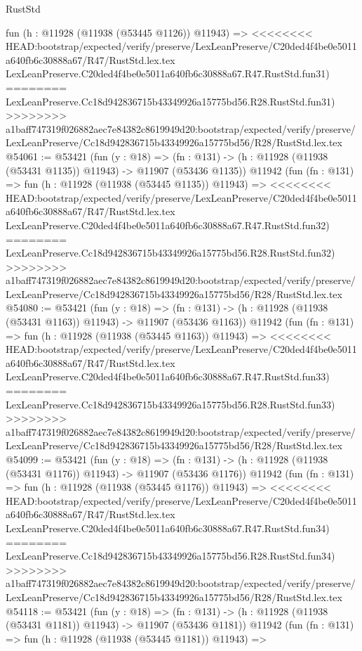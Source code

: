 \begin{lexlean}{RustStd}
\begin{coremodule}
{\begin{coremodule}
{{{{{{{{{{{{{{{{{{{{{{{{{{{{{{{{{{{{{{{{{{{{{{{{{{{{{{{{{{{{{{{{{{{{{{{{{{{{{{{{    fun (h : @11928 (@11938 (@53445 @1126)) @11943) =>
<<<<<<<< HEAD:bootstrap/expected/verify/preserve/LexLeanPreserve/C20ded4f4be0e5011a640fb6c30888a67/R47/RustStd.lex.tex
    LexLeanPreserve.C20ded4f4be0e5011a640fb6c30888a67.R47.RustStd.fun31)
========
    LexLeanPreserve.Cc18d942836715b43349926a15775bd56.R28.RustStd.fun31)
>>>>>>>> a1baff747319f026882aec7e84382c8619949d20:bootstrap/expected/verify/preserve/LexLeanPreserve/Cc18d942836715b43349926a15775bd56/R28/RustStd.lex.tex
@54061 := @53421
    (fun (y : @18) =>
    (fn : @131) -> (h : @11928 (@11938 (@53431 @1135)) @11943) -> @11907 (@53436 @1135))
    @11942
    (fun (fn : @131) =>
    fun (h : @11928 (@11938 (@53445 @1135)) @11943) =>
<<<<<<<< HEAD:bootstrap/expected/verify/preserve/LexLeanPreserve/C20ded4f4be0e5011a640fb6c30888a67/R47/RustStd.lex.tex
    LexLeanPreserve.C20ded4f4be0e5011a640fb6c30888a67.R47.RustStd.fun32)
========
    LexLeanPreserve.Cc18d942836715b43349926a15775bd56.R28.RustStd.fun32)
>>>>>>>> a1baff747319f026882aec7e84382c8619949d20:bootstrap/expected/verify/preserve/LexLeanPreserve/Cc18d942836715b43349926a15775bd56/R28/RustStd.lex.tex
@54080 := @53421
    (fun (y : @18) =>
    (fn : @131) -> (h : @11928 (@11938 (@53431 @1163)) @11943) -> @11907 (@53436 @1163))
    @11942
    (fun (fn : @131) =>
    fun (h : @11928 (@11938 (@53445 @1163)) @11943) =>
<<<<<<<< HEAD:bootstrap/expected/verify/preserve/LexLeanPreserve/C20ded4f4be0e5011a640fb6c30888a67/R47/RustStd.lex.tex
    LexLeanPreserve.C20ded4f4be0e5011a640fb6c30888a67.R47.RustStd.fun33)
========
    LexLeanPreserve.Cc18d942836715b43349926a15775bd56.R28.RustStd.fun33)
>>>>>>>> a1baff747319f026882aec7e84382c8619949d20:bootstrap/expected/verify/preserve/LexLeanPreserve/Cc18d942836715b43349926a15775bd56/R28/RustStd.lex.tex
@54099 := @53421
    (fun (y : @18) =>
    (fn : @131) -> (h : @11928 (@11938 (@53431 @1176)) @11943) -> @11907 (@53436 @1176))
    @11942
    (fun (fn : @131) =>
    fun (h : @11928 (@11938 (@53445 @1176)) @11943) =>
<<<<<<<< HEAD:bootstrap/expected/verify/preserve/LexLeanPreserve/C20ded4f4be0e5011a640fb6c30888a67/R47/RustStd.lex.tex
    LexLeanPreserve.C20ded4f4be0e5011a640fb6c30888a67.R47.RustStd.fun34)
========
    LexLeanPreserve.Cc18d942836715b43349926a15775bd56.R28.RustStd.fun34)
>>>>>>>> a1baff747319f026882aec7e84382c8619949d20:bootstrap/expected/verify/preserve/LexLeanPreserve/Cc18d942836715b43349926a15775bd56/R28/RustStd.lex.tex
@54118 := @53421
    (fun (y : @18) =>
    (fn : @131) -> (h : @11928 (@11938 (@53431 @1181)) @11943) -> @11907 (@53436 @1181))
    @11942
    (fun (fn : @131) =>
    fun (h : @11928 (@11938 (@53445 @1181)) @11943) =>
}}}}}}}}}}}}}}}}}}}}}}}}}}}}}}}}}}}}}}}}}}}}}}}}}}}}}}}}}}}}}}}}}}}}}}}}}}}}}}}}
\end{coremodule}}
\end{coremodule}
\end{lexlean}
